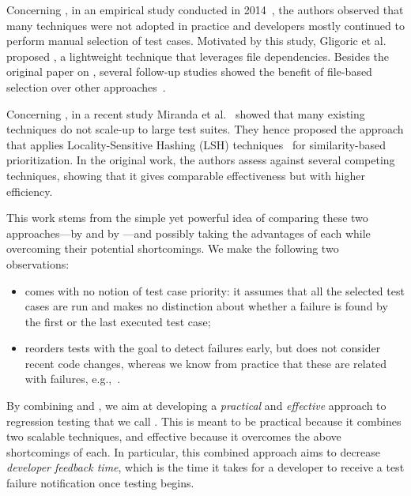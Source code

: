 Concerning \tcs, in an empirical study conducted in 2014~\cite{gligoric_empirical}, the authors observed that many techniques were not adopted in practice and developers mostly continued to perform manual selection of test cases.  
Motivated by this study, Gligoric et al.~\cite{gligoricEk} proposed  \ek,  a lightweight \tcs technique that leverages file dependencies.
Besides the original paper on \ek, several follow-up studies showed the benefit of file-based selection over other approaches~\cite{legunsen2016, Zhang18HybridRTS}.

Concerning \tcp, in a recent  study Miranda et al.~\cite{miranda_fast} showed that many existing techniques do not scale-up to large test suites.
They hence proposed the \fs approach that applies Locality-Sensitive Hashing (LSH) techniques~\cite{Leskovec:2014} for similarity-based prioritization.
In the original work, the authors assess \fs against several competing \tcp techniques, showing that it gives comparable effectiveness but with higher efficiency.

This work stems from the simple yet powerful idea of comparing these two approaches---\tcs by \ek and \tcp by \fs---and possibly taking the advantages of each while overcoming their potential shortcomings. 
%
We make the following two observations:
\begin{itemize}
\item \ek comes with no notion of test case priority: it assumes that all the selected test cases are run and makes no distinction about whether a failure is found by the first or the last executed test case;
\item \fs reorders tests with the goal to detect failures early, but does not consider recent code changes, whereas we know from practice that these are related with failures, e.g.,~\cite{knauss2015supporting,elbaum2014techniques}.
\end{itemize}

By combining \ek and \fs, we  aim at developing 
a \textit{practical} and \textit{effective} approach to regression testing that we call \emph{\fz}.
This is meant to be practical because it combines two scalable techniques, and effective because it overcomes the above shortcomings of each.
In particular, this combined approach aims to decrease \textit{developer feedback time}, which is the time it takes for a developer to receive a test failure notification once testing begins.

